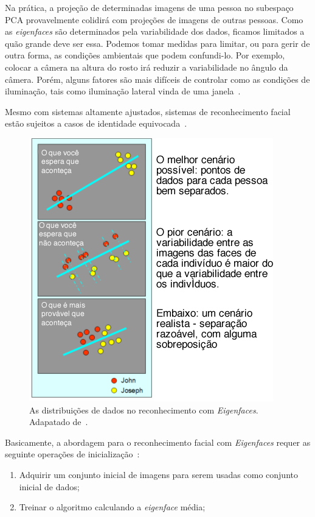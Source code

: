 	Na prática, a projeção de determinadas imagens de uma pessoa no subespaço PCA
	provavelmente colidirá com projeções de imagens de outras pessoas. Como as \textit{eigenfaces}
	são determinados pela variabilidade dos
	dados, ficamos limitados a quão grande deve ser essa. Podemos tomar medidas para
	limitar, ou para gerir de outra forma, as condições ambientais que podem
	confundi-lo. Por exemplo, colocar a câmera na altura do rosto irá reduzir a
	variabilidade no ângulo da câmera. Porém, alguns fatores são mais difíceis de
	controlar como as condições de iluminação, tais como iluminação lateral vinda de
	uma janela~\cite{hewitt}.
	
	Mesmo com sistemas altamente ajustados, sistemas de reconhecimento facial estão
	sujeitos a casos de identidade equivocada~\cite{hewitt}.

	\begin{figure}[H]
		\begin{center}
			\includegraphics[scale=6.0]{figuras/2.FundamentacaoTeorica/espacoPCA.png}
		\end{center}
		\caption{As distribuições de dados no reconhecimento com \textit{Eigenfaces}. Adapatado de~\cite{hewitt}.}
		\label{exemploEspacoPCA}
	\end{figure}

	Basicamente, a abordagem para o reconhecimento facial com \textit{Eigenfaces} requer as
	seguinte operações de inicialização~\cite{turk}:

	\begin{enumerate}
		\item Adquirir um conjunto inicial de imagens para serem usadas como conjunto inicial de dados;
		\item Treinar o algoritmo calculando a \textit{eigenface} média;
	\end{enumerate}

